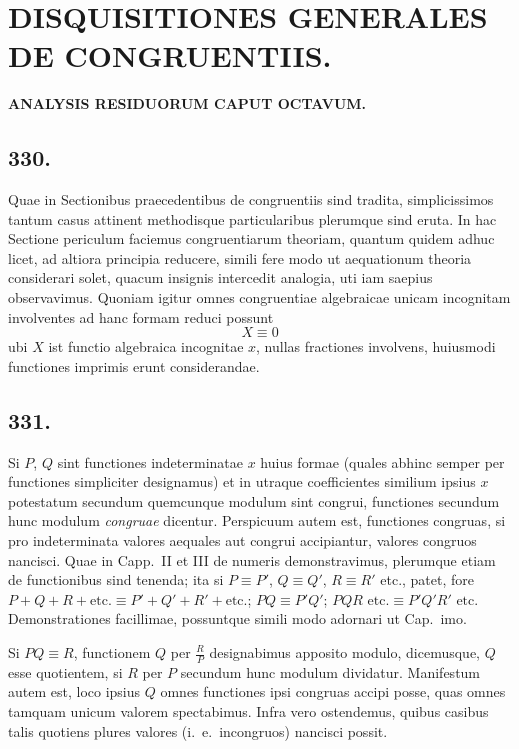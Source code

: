\documentclass[12pt,a4paper]{article}
\begin{document}
\newpage
\section*{DISQUISITIONES GENERALES DE CONGRUENTIIS.}

\noindent\textbf{ANALYSIS RESIDUORUM CAPUT OCTAVUM.}

\subsection*{330.}

Quae in Sectionibus praecedentibus de congruentiis sind tradita, simplicissimos tantum casus attinent methodisque particularibus plerumque sind eruta. In hac Sectione periculum faciemus congruentiarum theoriam, quantum quidem adhuc licet, ad altiora principia reducere, simili fere modo ut aequationum theoria considerari solet, quacum insignis intercedit analogia, uti iam saepius observavimus. Quoniam igitur omnes congruentiae algebraicae unicam incognitam involventes ad hanc formam reduci possunt
\[
X \equiv 0
\]
ubi $X$ ist functio algebraica incognitae $x$, nullas fractiones involvens, huiusmodi functiones imprimis erunt considerandae.

\subsection*{331.}

Si $P$, $Q$ sint functiones indeterminatae $x$ huius formae (quales abhinc semper per functiones simpliciter designamus) et in utraque coefficientes similium ipsius $x$ potestatum secundum quemcunque modulum sint congrui, functiones secundum hunc modulum \textit{congruae} dicentur. Perspicuum autem est, functiones congruas, si pro indeterminata valores aequales aut congrui accipiantur, valores congruos nancisci. Quae in Capp.~II et III de numeris demonstravimus, plerumque etiam de functionibus sind tenenda; ita si $P\equiv P'$, $Q\equiv Q'$, $R\equiv R'$ etc., patet, fore $P+Q+R+\text{etc.}\equiv P'+Q'+R'+\text{etc.}$; $PQ\equiv P'Q'$; $PQR\text{ etc.}\equiv P'Q'R'\text{ etc.}$ Demonstrationes facillimae, possuntque simili modo adornari ut Cap.~imo.

Si $PQ\equiv R$, functionem $Q$ per $\frac{R}{P}$ designabimus apposito modulo, dicemusque, $Q$ esse quotientem, si $R$ per $P$ secundum hunc modulum dividatur. Manifestum autem est, loco ipsius $Q$ omnes functiones ipsi congruas accipi posse, quas omnes tamquam unicum valorem spectabimus. Infra vero ostendemus, quibus casibus talis quotiens plures valores (i.~e.~incongruos) nancisci possit.
\end{document}
